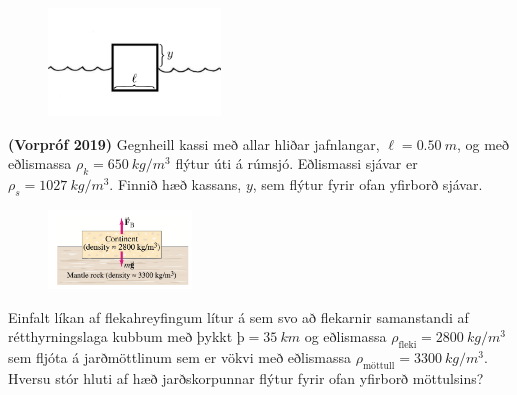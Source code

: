 \begin{enumerate}[label = \textbf{Dæmi \thechapter.\arabic*.}]
\begin{minipage}{\linewidth}
\end{minipage}

\vspace{2cm}


\begin{minipage}{\linewidth}

\begin{figure}
\vspace{-1.5cm}
\includegraphics[width=1.8in]{images/kubbursjor.png}
\end{figure}

\item \textbf{(Vorpróf 2019)} Gegnheill kassi með allar hliðar jafnlangar, $\ell = \SI{0.50}{m}$, og með eðlismassa $\rho_k = \SI{650}{kg/m^3}$ flýtur úti á rúmsjó. Eðlismassi sjávar er $\rho_s = \SI{1027}{kg/m^3}$. Finnið hæð kassans, $y$, sem flýtur fyrir ofan yfirborð sjávar.

\end{minipage}

\vspace{0.4cm}

\begin{minipage}{\linewidth}

\begin{figure}
\vspace{-1cm}
\includegraphics[width=1.5in]{images/jardskorpa.png}
\end{figure}

\item Einfalt líkan af flekahreyfingum lítur á sem svo að flekarnir samanstandi af rétthyrningslaga kubbum með þykkt $þ = \SI{35}{km}$ og eðlismassa $\rho_{\text{fleki}} = \SI{2800}{kg/m^3}$ sem fljóta á jarðmöttlinum sem er vökvi með eðlismassa $\rho_{\text{möttull}} = \SI{3300}{kg/m^3}$. Hversu stór hluti af hæð jarðskorpunnar flýtur fyrir ofan yfirborð möttulsins?
\end{minipage}




\end{enumerate}
